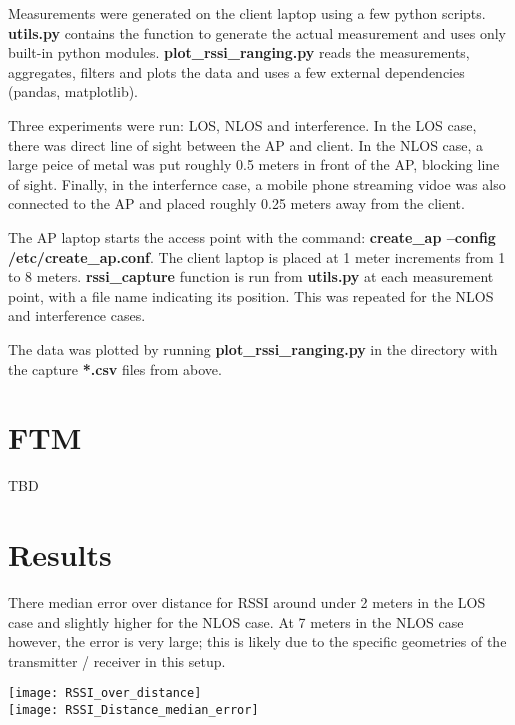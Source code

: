 \documentclass[10pt,letterpaper]{article}
\begin{document}
Measurements were generated on the client laptop using a few python
scripts. \textbf{utils.py} contains the function to generate the actual
measurement and uses only built-in python modules.
\textbf{plot\_rssi\_ranging.py} reads the measurements, aggregates, filters and
plots the data and uses a few external dependencies (pandas,
matplotlib).

Three experiments were run: LOS, NLOS and interference. In the LOS
case, there was direct line of sight between the AP and client. In the
NLOS case, a large peice of metal was put roughly 0.5 meters in front
of the AP, blocking line of sight. Finally, in the interfernce case, a
mobile phone streaming vidoe was also connected to the AP and placed
roughly 0.25 meters away from the client.

The AP laptop starts the access point with the command: \textbf{create\_ap
--config /etc/create\_ap.conf}. The client laptop is placed at 1 meter
increments from 1 to 8 meters. \textbf{rssi\_capture} function is run from
\textbf{utils.py} at each measurement point, with a file name indicating its
position. This was repeated for the NLOS and interference cases.

The data was plotted by running \textbf{plot\_rssi\_ranging.py} in the
directory with the capture \textbf{*.csv} files from above.

\section{FTM}
TBD

\section{Results}
There median error over distance for RSSI around under 2 meters in the
LOS case and slightly higher for the NLOS case. At 7 meters in the
NLOS case however, the error is very large; this is likely due to the
specific geometries of the transmitter / receiver in this setup. 

\texttt{[image: RSSI\_over\_distance]}
\\
\texttt{[image: RSSI\_Distance\_median\_error]}
\end{document}
